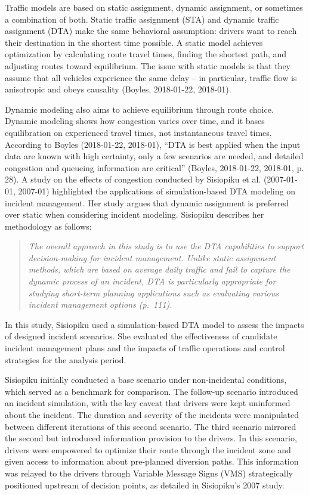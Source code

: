 \documentclass[fancy, oneside, mastersfancy, ms]{byuthesis}
\begin{document}
Traffic models are based on static assignment, dynamic assignment, or
sometimes a combination of both. Static traffic assignment (STA) and
dynamic traffic assignment (DTA) make the same behavioral assumption:
drivers want to reach their destination in the shortest time possible. A
static model achieves optimization by calculating route travel times,
finding the shortest path, and adjusting routes toward equilibrium. The
issue with static models is that they assume that all vehicles
experience the same delay -- in particular, traffic flow is anisotropic
and obeys causality (Boyles, 2018-01-22, 2018-01).

Dynamic modeling also aims to achieve equilibrium through route choice.
Dynamic modeling shows how congestion varies over time, and it bases
equilibration on experienced travel times, not instantaneous travel
times. According to Boyles (2018-01-22, 2018-01), ``DTA is best applied
when the input data are known with high certainty, only a few scenarios
are needed, and detailed congestion and queueing information are
critical'' (Boyles, 2018-01-22, 2018-01, p. 28). A study on the effects
of congestion conducted by Sisiopiku et al. (2007-01-01, 2007-01)
highlighted the applications of simulation-based DTA modeling on
incident management. Her study argues that dynamic assignment is
preferred over static when considering incident modeling. Sisiopiku
describes her methodology as follows:

\begin{quote}
\emph{The overall approach in this study is to use the DTA capabilities
to support decision-making for incident management. Unlike static
assignment methods, which are based on average daily traffic and fail to
capture the dynamic process of an incident, DTA is particularly
appropriate for studying short-term planning applications such as
evaluating various incident management options (p.~111).}
\end{quote}

In this study, Sisiopiku used a simulation-based DTA model to assess the
impacts of designed incident scenarios. She evaluated the effectiveness
of candidate incident management plans and the impacts of traffic
operations and control strategies for the analysis period.

Sisiopiku initially conducted a base scenario under non-incidental
conditions, which served as a benchmark for comparison. The follow-up
scenario introduced an incident simulation, with the key caveat that
drivers were kept uninformed about the incident. The duration and
severity of the incidents were manipulated between different iterations
of this second scenario. The third scenario mirrored the second but
introduced information provision to the drivers. In this scenario,
drivers were empowered to optimize their route through the incident zone
and given access to information about pre-planned diversion paths. This
information was relayed to the drivers through Variable Message Signs
(VMS) strategically positioned upstream of decision points, as detailed
in Sisiopiku's 2007 study.
\end{document}
